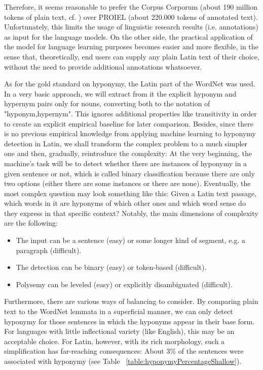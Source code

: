 \documentclass[jou]{apa6} %
\begin{document}
Therefore, it seems reasonable to prefer the Corpus Corporum (about 190 million tokens of plain text, cf. \cite{roelliCorpusCorporumNew2014}) over PROIEL (about 220.000 tokens of annotated text). Unfortunately, this limits the usage of linguistic research results (i.e. annotations) as input for the language models. On the other side, the practical application of the model for language learning purposes becomes easier and more flexible, in the sense that, theoretically, end users can supply any plain Latin text of their choice, without the need to provide additional annotations whatsoever. 

As for the gold standard on hyponymy, the Latin part of the WordNet was used. In a very basic approach, we will extract from it the explicit hyponym and hypernym pairs only for nouns, converting both to the notation of "hyponym,hypernym". This ignores additional properties like transitivity in order to create an explicit empirical baseline for later comparison. Besides, since there is no previous empirical knowledge from applying machine learning to hyponymy detection in Latin, we shall transform the complex problem to a much simpler one and then, gradually, reintroduce the complexity: At the very beginning, the machine's task will be to detect whether there are instances of hyponymy in a given sentence or not, which is called binary classification because there are only two options (either there are some instances or there are none). Eventually, the most complex question may look something like this: Given a Latin text passage, which words in it are hyponyms of which other ones and which word sense do they express in that specific context? Notably, the main dimensions of complexity are the following:
\begin{itemize}
         \item The input can be a sentence (easy) or some longer kind of segment, e.g. a paragraph (difficult).
         \item The detection can be binary (easy) or token-based (difficult).
         \item Polysemy can be leveled (easy) or explicitly disambiguated (difficult).
\end{itemize}
Furthermore, there are various ways of balancing to consider. By comparing plain text to the WordNet lemmata in a superficial manner, we can only detect hyponymy for those sentences in which the hyponyms appear in their base form. For languages with little inflectional variety (like English), this may be an acceptable choice. For Latin, however, with its rich morphology, such a simplification has far-reaching consequences: About 3\% of the sentences were associated with hyponymy (see Table ~\ref{table:hyponymyPercentageShallow}).
\end{document}
